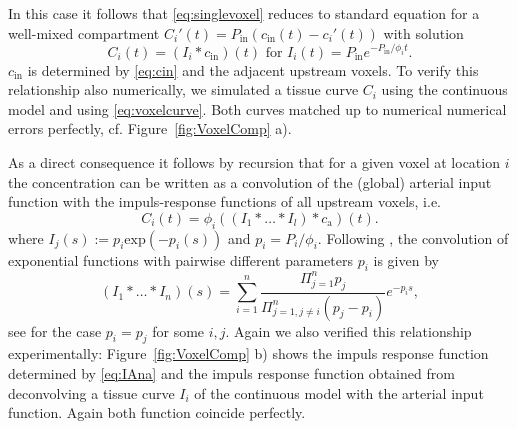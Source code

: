 \documentclass[journal,twocolumn]{IEEEtran}
\newcommand{\ca}{c_\mathrm{a}}
\begin{document}
	In this case it follows that \eqref{eq:singlevoxel} reduces to standard equation for a well-mixed compartment $C_i'(t) = P_{\mathrm{in}} (c_\mathrm{in}(t) - c_i'(t))$ with solution
	\begin{equation}\label{eq:voxelcurve}
		C_i(t) = (I_i*c_{\mathrm{in}})(t)
			\text{ for } I_i(t)=P_{\mathrm{in}}e^{- P_{\mathrm{in}}/\phi_it}.
	\end{equation}
	$c_{\mathrm{in}}$ is determined by \eqref{eq:cin} and the adjacent upstream voxels.
	To verify this relationship also numerically, we simulated a tissue curve $C_i$ using the continuous model and using \eqref{eq:voxelcurve}. 
	Both curves matched up to numerical numerical errors perfectly, cf. Figure~\ref{fig:VoxelComp} a).
		
	As a direct consequence it follows by recursion that for a given voxel at location $i$ the concentration can be written as a convolution of the (global) arterial input function with the impuls-response functions of all upstream voxels, i.e.
	\[
		C_i(t) = \phi_i((I_1*\dots *I_l)*\ca)(t).
	\]
	where $I_j(s):=p_i\mathrm{exp}(- p_i(s))$ and $p_i=P_i/\phi_i$.
	Following \cite{Kordecki97}, the convolution of exponential functions with pairwise different parameters $p_i$ is given by
	\begin{equation}\label{eq:IAna}
		(I_1*\dots *I_n)(s) = \sum_{i=1}^n \frac{\Pi_{j=1}^n p_j}{\Pi_{j=1,j\neq i}^n(p_j-p_i)}e^{-p_is},
	\end{equation}
	see \cite{Kordecki97} for the case $p_i=p_j$ for some $i,j$.
	Again we also verified this relationship experimentally: Figure~\ref{fig:VoxelComp} b) shows the impuls response function determined by \eqref{eq:IAna} and the impuls response function obtained from deconvolving a tissue curve $I_i$ of the continuous model with the arterial input function.
	Again both function coincide perfectly.
	
\end{document}
